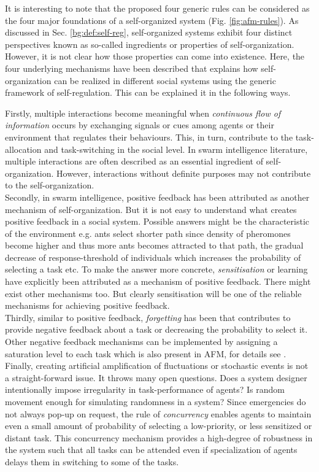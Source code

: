 It is interesting to note that the proposed four generic rules can be considered as  the four major foundations of a self-organized system (Fig.  \ref{fig:afm-rules}). As discussed in Sec. \ref{bg:def:self-reg},  self-organized systems exhibit four distinct perspectives known as so-called ingredients or properties of self-organization. However, it is not clear how those properties can come into existence. Here, the four underlying mechanisms have been described that explains how self-organization can be realized in different social systems using the generic framework of self-regulation. This can be explained it in the following ways.

Firstly, multiple interactions become meaningful when {\em continuous flow of information} occurs  by exchanging signals or cues among agents or their environment  that regulates their behaviours. This, in turn, contribute to the task-allocation  and task-switching in the social level.  In swarm intelligence literature, multiple interactions are often described as an essential ingredient of self-organization. However, interactions without definite purposes may not contribute to the self-organization.\\
Secondly, in swarm intelligence, positive feedback has been attributed as another mechanism of  self-organization. But it is not easy to understand what creates positive feedback in a social system. Possible answers might be the characteristic of the environment e.g. ants select shorter path since density of pheromones become higher and thus more ants becomes attracted to that path, the gradual decrease of response-threshold of individuals which increases the probability of selecting a task etc.  To make the answer more concrete, {\em sensitisation} or learning have explicitly been attributed as a mechanism of positive feedback. There might exist other mechanisms too. But clearly sensitisation will be one of the reliable mechanisms for achieving positive feedback.\\
Thirdly, similar to positive feedback,  {\em forgetting} has been that contributes to provide negative feedback about a task or decreasing the probability to select it. Other negative feedback mechanisms can be implemented by assigning a saturation level to each task which is also present in AFM, for details see .\\
Finally, creating  artificial amplification of fluctuations or stochastic events is not a straight-forward issue. It throws  many open questions. Does a system designer intentionally impose irregularity in task-performance of agents?  Is random movement  enough for simulating randomness in a system?
Since emergencies do not always pop-up on request, the rule of {\em concurrency} enables agents to  maintain even a small amount of probability of selecting a low-priority, or less sensitized or distant task. This concurrency mechanism provides a high-degree of robustness in the system such that all tasks can be attended even if specialization of agents delays them in switching to some of the tasks.
